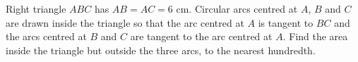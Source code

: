 Right triangle $ABC$ has $AB=AC=6$ cm. Circular arcs centred at $A$, $B$ and $C$ are drawn inside the triangle so that the arc centred at $A$ is tangent to $BC$ and the arcs centred at $B$ and $C$ are tangent to the arc centred at $A$. Find the area inside the triangle but outside the three arcs, to the nearest hundredth.
